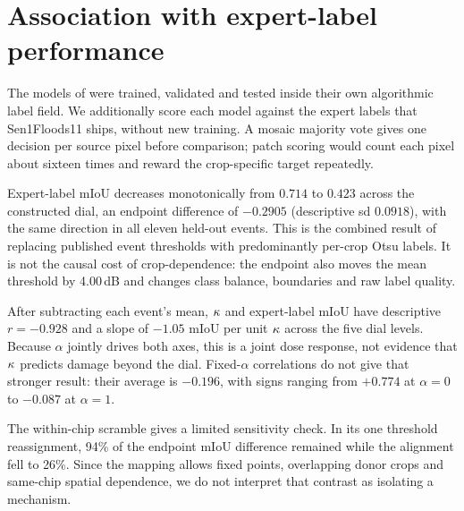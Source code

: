 \section{Association with expert-label performance}
\label{sec:cost}

The models of  were trained, validated and tested inside their own
algorithmic label field. We additionally score each model against the expert labels
that Sen1Floods11 ships, without new training. A mosaic majority vote gives one
decision per source pixel before comparison; patch scoring would count each pixel
about sixteen times and reward the crop-specific target repeatedly.

Expert-label mIoU decreases monotonically from $0.714$ to $0.423$ across the
constructed dial, an endpoint difference of $-0.2905$ (descriptive sd $0.0918$),
with the same direction in all eleven held-out events. This is the combined result of
replacing published event thresholds with predominantly per-crop Otsu labels. It is
not the causal cost of crop-dependence: the endpoint also moves the mean threshold by
4.00\,dB and changes class balance, boundaries and raw label quality.

After subtracting each event's mean, $\kappa$ and expert-label mIoU have descriptive
$r=-0.928$ and a slope of $-1.05$ mIoU per unit $\kappa$ across the five dial levels.
Because $\alpha$ jointly drives both axes, this is a joint dose response, not evidence
that $\kappa$ predicts damage beyond the dial. Fixed-$\alpha$ correlations do not give
that stronger result: their average is $-0.196$, with signs ranging from $+0.774$ at
$\alpha=0$ to $-0.087$ at $\alpha=1$.

The within-chip scramble gives a limited sensitivity check. In its one threshold
reassignment, 94\% of the endpoint mIoU difference remained while the alignment fell
to 26\%. Since the mapping allows fixed points, overlapping donor crops and same-chip
spatial dependence, we do not interpret that contrast as isolating a mechanism.
